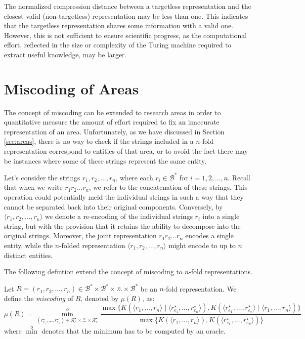 The normalized compression distance between a targetless representation and the closest valid (non-targetless) representation may be less than one. This indicates that the targetless representation shares some information with a valid one. However, this is not sufficient to ensure scientific progress, as the computational effort, reflected in the size or complexity of the Turing machine required to extract useful knowledge, may be larger.

%
%
\section{Miscoding of Areas}
\label{sec:miscoding_areas}

The concept of miscoding can be extended to research areas in order to quantitative measure the amount of effort required to fix an inaccurate representation of an area. Unfortunately, as we have discussed in Section \ref{sec:areas}, there is no way to check if the strings included in a $n$-fold representation correspond to entities of that area, or to avoid the fact there may be instances where some of these strings represent the same entity.

Let's consider the strings $r_1, r_2, \ldots, r_n$, where each $r_i \in \mathcal{B}^\ast$ for $i=1, 2, \ldots, n$. Recall that when we write $r_1 r_2 \ldots r_n$, we refer to the concatenation of these strings. This operation could potentially meld the individual strings in such a way that they cannot be separated back into their original components. Conversely, by $\langle r_1, r_2, \ldots, r_n \rangle$ we denote a re-encoding of the individual strings $r_i$ into a single string, but with the provision that it retains the ability to decompose into the original strings. Moreover, the joint representation $r_1 r_2 \ldots r_n$ encodes a single entity, while the $n$-folded representation $\langle r_1, r_2, \ldots, r_n \rangle$ might encode to up to $n$ distinct entities.

The following defintion extend the concept of miscoding to $n$-fold representations.

\begin{definition}
Let $R = \left( r_1, r_2, \ldots, r_n \right) \in \mathcal{B}^\ast \times \mathcal{B}^\ast \times \overset{n} \ldots \times \mathcal{B}^\ast$  be an $n$-fold representation. We define the \emph{miscoding} of $R$, denoted by $\mu(R)$, as:
\[
\mu(R) = \overset{o}{ \underset{ (r^\star_{e_1}, \ldots, r^\star_{e_n}) \in \mathcal{R}^\star_\mathcal{E} \times \overset{n} \ldots \times \mathcal{R}^\star_\mathcal{E} } \min} \frac{ \max\{ K \left( \langle r_1, \ldots, r_n \rangle \mid \langle r^\star_{e_1}, \ldots, r^\star_{e_n} \rangle \right), K \left( \langle  r^\star_{e_1}, \ldots, r^\star_{e_n} \rangle \mid \langle r_1, \ldots, r_n \rangle \right) \} } { \max\{ K \left( \langle r_1, \ldots, r_n \rangle \right), K \left( \langle r^\star_{e_1}, \ldots, r^\star_{e_n} \rangle \right) \} }
\]
where $\overset{o}{\min}$ denotes that the minimum has to be computed by an oracle.
\end{definition}


